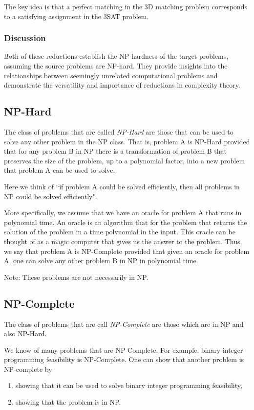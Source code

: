 The key idea is that a perfect matching in the 3D matching problem corresponds to a satisfying assignment in the 3SAT problem.

\subsubsection{Discussion}
Both of these reductions establish the NP-hardness of the target problems, assuming the source problems are NP-hard. They provide insights into the relationships between seemingly unrelated computational problems and demonstrate the versatility and importance of reductions in complexity theory.

\subsection{NP-Hard}
The class of problems that are called \emph{NP-Hard} are those that can be used to solve any other problem in the NP class.  
That is, problem A is NP-Hard provided that for any problem B in NP there is a transformation of problem B that preserves the size of the problem, up to a polynomial factor, into a new problem that problem A can be used to solve.

Here we think of ``if problem A could be solved efficiently, then all problems in NP could be solved efficiently".

More specifically, we assume that we have an oracle for problem A that runs in polynomial time.  An oracle is an algorithm that for the problem that returns the solution of the problem in a time polynomial in the input.   This oracle can be thought of as a magic computer that gives us the answer to the problem.   
Thus, we say that problem A is NP-Complete provided that given an oracle for problem A, one can solve any other problem B in NP in polynomial time.

Note:  These problems are not necessarily in NP.

\subsection{NP-Complete}
The class of problems that are call \emph{NP-Complete} are those which are in NP and also NP-Hard.  

We know of many problems that are NP-Complete.  For example, binary integer programming feasibility is NP-Complete.  One can show that another problem is NP-complete by 
\begin{enumerate}
\item showing that it can be used to solve binary integer programming feasibility,
\item showing that the problem is in NP.
\end{enumerate}

